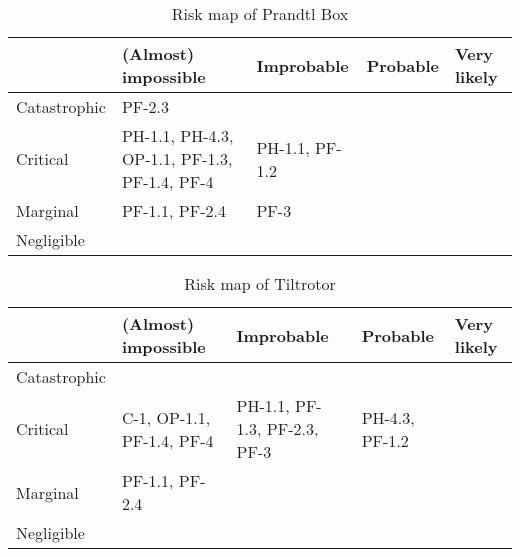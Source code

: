 \begin{table}[H]
    \centering
    \caption{Risk map of Prandtl Box}
    \label{tab:risk_map_pran_box}
    \begin{tabular}{p{2.5cm}p{2.5cm}p{2.5cm}p{2.5cm}p{2.5cm}}
    \toprule
                    & (Almost) impossible                                               & Improbable                            & Probable                          & Very likely
    \\ \midrule
    Catastrophic    &\cellcolor[HTML]{d9ead3}   PF-2.3                                        &\cellcolor[HTML]{fff2cc}               &\cellcolor[HTML]{f4cccc}           &\cellcolor[HTML]{f4cccc} 
    \\ \hdashline
    Critical        &\cellcolor[HTML]{d9ead3} PH-1.1, PH-4.3, OP-1.1, PF-1.3, PF-1.4, PF-4   &\cellcolor[HTML]{fff2cc} PH-1.1, PF-1.2 &\cellcolor[HTML]{fff2cc}           &\cellcolor[HTML]{f4cccc}
    \\ \hdashline
    Marginal        &\cellcolor[HTML]{d9ead3}  PF-1.1, PF-2.4                            &\cellcolor[HTML]{d9ead3}  PF-3         &\cellcolor[HTML]{fff2cc}           &\cellcolor[HTML]{fff2cc}
    \\ \hdashline
    Negligible      &\cellcolor[HTML]{d9ead3}                                           &\cellcolor[HTML]{d9ead3}               &\cellcolor[HTML]{d9ead3}           &\cellcolor[HTML]{d9ead3}
    \\ \bottomrule
    \end{tabular}
\end{table}


\begin{table}[H]
    \centering
    \caption{Risk map of Tiltrotor}
    \label{tab:risk_map_tilt}
    \begin{tabular}{p{2.5cm}p{2.5cm}p{2.5cm}p{2.5cm}p{2.5cm}}
    \toprule
                    & (Almost) impossible           & Improbable                    & Probable                          & Very likely
    \\ \midrule
    Catastrophic    &\cellcolor[HTML]{d9ead3}       &\cellcolor[HTML]{fff2cc}       &\cellcolor[HTML]{f4cccc}           &\cellcolor[HTML]{f4cccc}
    \\ \hdashline
    Critical        &\cellcolor[HTML]{d9ead3} C-1, OP-1.1, PF-1.4, PF-4       &\cellcolor[HTML]{fff2cc} PH-1.1, PF-1.3, PF-2.3, PF-3      &\cellcolor[HTML]{fff2cc}   PH-4.3, PF-1.2         &\cellcolor[HTML]{f4cccc}
    \\ \hdashline
    Marginal        &\cellcolor[HTML]{d9ead3} PF-1.1, PF-2.4      &\cellcolor[HTML]{d9ead3}       &\cellcolor[HTML]{fff2cc}           &\cellcolor[HTML]{fff2cc}
    \\ \hdashline
    Negligible      &\cellcolor[HTML]{d9ead3}       &\cellcolor[HTML]{d9ead3}       &\cellcolor[HTML]{d9ead3}           &\cellcolor[HTML]{d9ead3}
    \\ \bottomrule
    \end{tabular}
\end{table}


